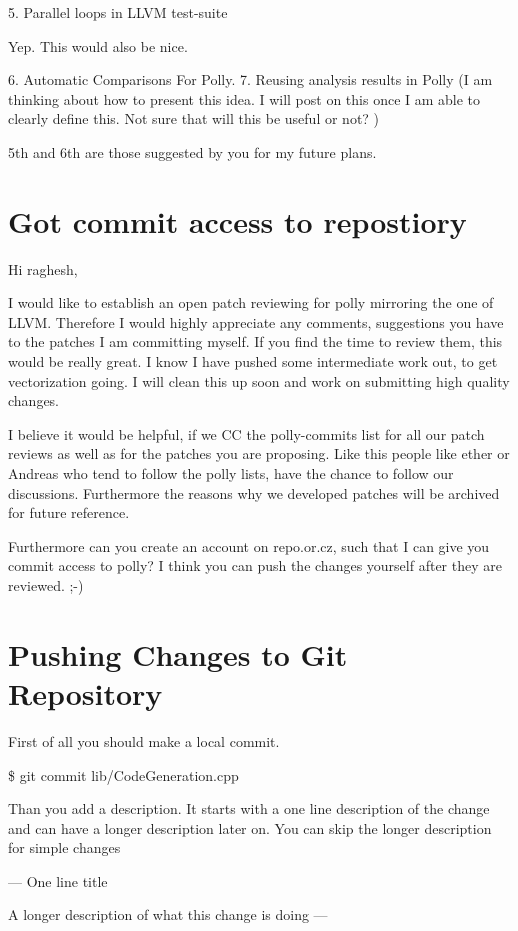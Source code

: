 \documentclass[a4paper,10pt]{article}
\begin{document}
		      5. Parallel loops in LLVM test-suite

		     Yep. This would also be nice.

		      6. Automatic Comparisons For Polly.
		      7. Reusing analysis results in Polly (I am thinking about how to
				     present this idea. I will post on this once I am able to clearly
				     define this. Not sure that will this be useful or not? )

		     5th and 6th are those suggested by you for my future plans.

		     
\section{Got commit access to repostiory}
Hi raghesh,

   I would like to establish an open patch reviewing for polly mirroring the one of LLVM. Therefore I would highly appreciate any comments, suggestions you have to the patches I am committing myself. If you find the time to review them, this would be really great. I know I have pushed some intermediate work out, to get vectorization going. I will clean this up soon and work on submitting high quality changes.

   I believe it would be helpful, if we CC the polly-commits list for all our patch reviews as well as for the patches you are proposing. Like this people like ether or Andreas who tend to follow the polly lists, have the chance to follow our discussions. Furthermore the reasons why we developed patches will be archived for future reference.

   Furthermore can you create an account on repo.or.cz, such that I can give you commit access to polly? I think you can push the changes yourself after they are reviewed. ;-)

\section{Pushing Changes to Git Repository}
   First of all you should make a local commit.

   \$ git commit lib/CodeGeneration.cpp

   Than you add a description. It starts with a one line description of the change and can have a longer description later on. You can skip the longer description for simple changes

   ---
   One line title

   A longer description of what this change is doing
   ---
\end{document}
